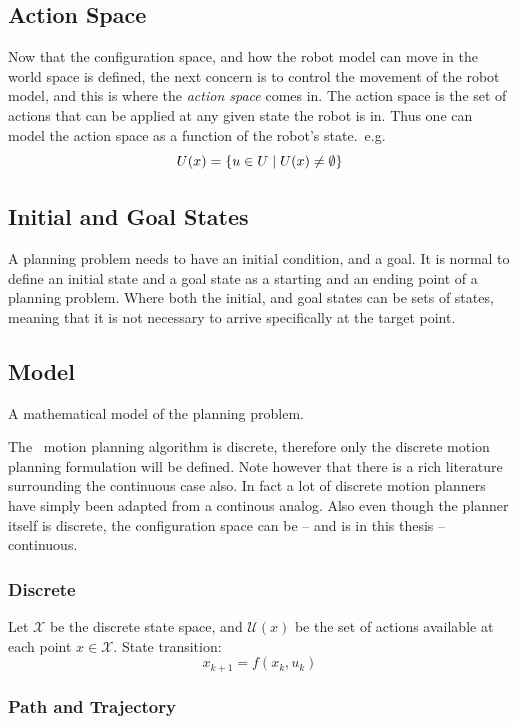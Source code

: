 \subsection{Action Space}

Now that the configuration space, and how the robot model can move in the world
space is defined, the next concern is to control the movement of the robot
model, and this is where the \textit{action space} comes in. The action space is
the set of actions that can be applied at any given state the robot is in. Thus
one can model the action space as a function of the robot's state.\ e.g.
\[
  U(x) = \lbrace u \in U \mid U(x)
    \neq \emptyset \rbrace
\]

\subsection{Initial and Goal States}

A planning problem needs to have an initial condition, and a goal. It is normal
to define an initial state and a goal state as a starting and an ending point of
a planning problem. Where both the initial, and goal states can be sets of
states, meaning that it is not necessary to arrive specifically at the target
point.

\subsection{Model}

A mathematical model of the planning problem.

The \rrtfunnel\ motion planning algorithm is discrete, therefore only the
discrete motion planning formulation will be defined. Note however that there is
a rich literature surrounding the continuous case also. In fact a lot of
discrete motion planners have simply been adapted from a continous analog. Also
even though the planner itself is discrete, the configuration space can be --
and is in this thesis -- continuous.

\subsubsection{Discrete}

Let \(\mathcal{X}\) be the discrete state space, and \(\mathcal{U}(x)\) be the
set of actions available at each point \(x \in \mathcal{X}\). State transition:\
\[
  x_{k+1} = f(x_k, u_k)
\]

\subsubsection{Path and Trajectory}

